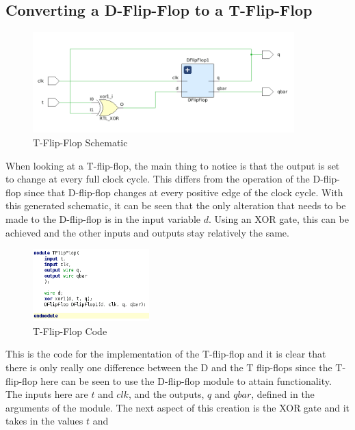 \documentclass[12pt]{article}
\begin{document}
    \subsection*{Converting a D-Flip-Flop to a T-Flip-Flop}
    \begin{figure}[h]
        \centering
        \includegraphics[width=0.9\textwidth]{TFlipFlop Schematic.png}
        \caption{T-Flip-Flop Schematic}
    \end{figure}
    \par When looking at a T-flip-flop, the main thing to notice is that the
    output is set to change at every full clock cycle. This differs from the
    operation of the D-flip-flop since that D-flip-flop changes at every
    positive edge of the clock cycle. With this generated schematic, it can be
    seen that the only alteration that needs to be made to the D-flip-flop is in
    the input variable $d$. Using an XOR gate, this can be achieved and the
    other inputs and outputs stay relatively the same.
    \begin{figure}[h]
        \centering
        \includegraphics[width=0.4\textwidth]{TFlipFlop Code.png}
        \caption{T-Flip-Flop Code}
    \end{figure}
    \par This is the code for the implementation of the T-flip-flop and it is
    clear that there is only really one difference between the D and the T
    flip-flops since the T-flip-flop here can be seen to use the D-flip-flop
    module to attain functionality. The inputs here are $t$ and $clk$, and the
    outputs, $q$ and $qbar$, defined in the arguments of the module. The next
    aspect of this creation is the XOR gate and it takes in the values $t$ and
\end{document}

